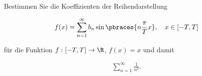 
\begin{exercise}

Bestimmen Sie die Koeffizienten der Reihendarstellung

\begin{align*}
    f(x)
    =
    \sum_{n=1}^\infty
    b_n
    \sin \pbraces{n \frac{\pi}{T} x},
    \quad
    x \in [-T, T]
\end{align*}

für die Funktion $f: [-T, T] \to \R$, $f(x) = x$ und damit

\begin{align*}
    \sum_{n=1}^\infty
    \frac{1}{n^2}.
\end{align*}

\end{exercise}


